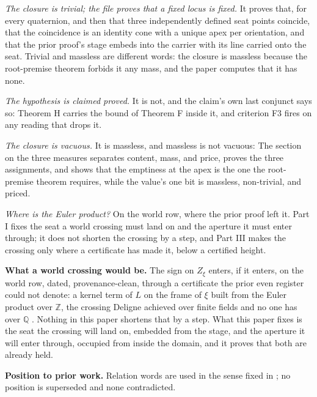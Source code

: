 \documentclass[10pt]{article}
\begin{document}
\emph{The closure is trivial; the file proves that a fixed locus is
fixed.} It proves that, for every quaternion, and then that three
independently defined seat points coincide, that the coincidence is an
identity cone with a unique apex per orientation, and that the prior
proof's stage embeds into the carrier with its line carried onto the
seat. Trivial and massless are different words: the closure is massless
because the root-premise theorem forbids it any mass, and the paper
computes that it has none.

\emph{The hypothesis is claimed proved.} It is not, and the claim's own
last conjunct says so: Theorem H carries the bound of Theorem F inside
it, and criterion F3 fires on any reading that drops it.

\emph{The closure is vacuous.} It is massless, and massless is not
vacuous: The section on the three measures separates content, mass, and
price, proves the three assignments, and shows that the emptiness at the
apex is the one the root-premise theorem requires, while the value's one
bit is massless, non-trivial, and priced.

\emph{Where is the Euler product?} On the world row, where the prior
proof left it. Part I fixes the seat a world crossing must land on and
the aperture it must enter through; it does not shorten the crossing by
a step, and Part III makes the crossing only where a certificate has
made it, below a certified height.

\textbf{What a world crossing would be.} The sign on \(Z_\xi\) enters,
if it enters, on the world row, dated, provenance-clean, through a
certificate the prior even register could not denote: a kernel term of
\(L\) on the frame of \(\xi\) built from the Euler product over
\(\mathbb{Z}\), the crossing Deligne achieved over finite fields and no
one has over \(\mathbb{Q}\) \cite{deligne1974}. Nothing in this paper
shortens that by a step. What this paper fixes is the seat the crossing
will land on, embedded from the stage, and the aperture it will enter
through, occupied from inside the domain, and it proves that both are
already held.

\textbf{Position to prior work.} Relation words are used in the sense
fixed in \cite{islamcodex}; no position is superseded and none
contradicted.
\end{document}
